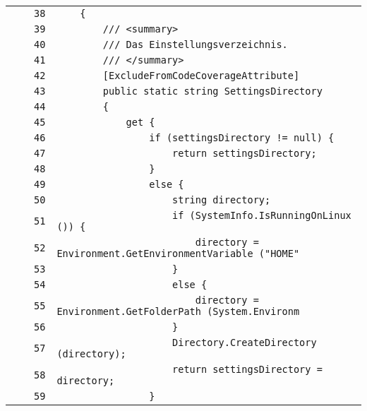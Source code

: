 \documentclass[a4paper,10pt]{article}
\begin{document}
\begin{longtable}[l]{lrrl}
\cellcolor{gray} &  & \verb~38~ & \verb~    {~\\
\cellcolor{gray} &  & \verb~39~ & \verb~        /// <summary>~\\
\cellcolor{gray} &  & \verb~40~ & \verb~        /// Das Einstellungsverzeichnis.~\\
\cellcolor{gray} &  & \verb~41~ & \verb~        /// </summary>~\\
\cellcolor{gray} &  & \verb~42~ & \verb~        [ExcludeFromCodeCoverageAttribute]~\\
\cellcolor{gray} &  & \verb~43~ & \verb~        public static string SettingsDirectory~\\
\cellcolor{gray} &  & \verb~44~ & \verb~        {~\\
\cellcolor{gray} &  & \verb~45~ & \verb~            get {~\\
\cellcolor{gray} &  & \verb~46~ & \verb~                if (settingsDirectory != null) {~\\
\cellcolor{gray} &  & \verb~47~ & \verb~                    return settingsDirectory;~\\
\cellcolor{gray} &  & \verb~48~ & \verb~                }~\\
\cellcolor{gray} &  & \verb~49~ & \verb~                else {~\\
\cellcolor{gray} &  & \verb~50~ & \verb~                    string directory;~\\
\cellcolor{gray} &  & \verb~51~ & \verb~                    if (SystemInfo.IsRunningOnLinux ()) {~\\
\cellcolor{gray} &  & \verb~52~ & \verb~                        directory = Environment.GetEnvironmentVariable ("HOME"~\\
\cellcolor{gray} &  & \verb~53~ & \verb~                    }~\\
\cellcolor{gray} &  & \verb~54~ & \verb~                    else {~\\
\cellcolor{gray} &  & \verb~55~ & \verb~                        directory = Environment.GetFolderPath (System.Environm~\\
\cellcolor{gray} &  & \verb~56~ & \verb~                    }~\\
\cellcolor{gray} &  & \verb~57~ & \verb~                    Directory.CreateDirectory (directory);~\\
\cellcolor{gray} &  & \verb~58~ & \verb~                    return settingsDirectory = directory;~\\
\cellcolor{gray} &  & \verb~59~ & \verb~                }~\\

\end{longtable}
\end{document}
